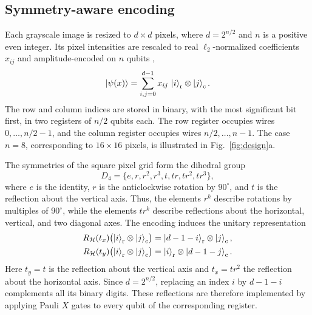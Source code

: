 \documentclass[aps,pra,reprint,superscriptaddress,longbibliography]{revtex4-2}
\begin{document}
\subsection{Symmetry-aware encoding}\label{subsec:encoding}
Each grayscale image is resized to $d\times d$ pixels, where
$d=2^{n/2}$ and $n$ is a positive even integer. Its pixel intensities
are rescaled to real $\ell_2$-normalized coefficients $x_{ij}$ and amplitude-encoded on $n$ qubits
\citep{schuld2021machine,yao2017quantum},
\begin{equation}
\ket{\psi(x)}
=\sum_{i,j=0}^{d-1}x_{ij}\,\ket{i}_{\mathrm r}\otimes\ket{j}_{\mathrm c}.
\label{eq:encoding}
\end{equation}
The row and column indices are stored in binary, with the most
significant bit first, in two registers of $n/2$ qubits each.
The row register occupies wires $0,\ldots,n/2-1$, and the column
register occupies wires $n/2,\ldots,n-1$. The case $n=8$, corresponding
to $16\times16$ pixels, is illustrated in Fig.~\ref{fig:design}a.

The symmetries of the square pixel grid form the dihedral group
\begin{equation}
D_4=\{e,r,r^2,r^3,t,tr,tr^2,tr^3\},
\end{equation}
where $e$ is the identity, $r$ is the anticlockwise rotation by
$90^\circ$, and $t$ is the reflection about the vertical axis.
Thus, the elements $r^k$ describe rotations by multiples of
$90^\circ$, while the elements $tr^k$ describe reflections about
the horizontal, vertical, and two diagonal axes.
The encoding induces the unitary representation
\begin{equation}
\begin{aligned}
R_{\mathcal H}(t_x)
\bigl(\ket{i}_{\mathrm r}\otimes\ket{j}_{\mathrm c}\bigr)
&=\ket{d-1-i}_{\mathrm r}\otimes\ket{j}_{\mathrm c},\\
R_{\mathcal H}(t_y)
\bigl(\ket{i}_{\mathrm r}\otimes\ket{j}_{\mathrm c}\bigr)
&=\ket{i}_{\mathrm r}\otimes\ket{d-1-j}_{\mathrm c}.
\end{aligned}
\end{equation}
Here $t_y=t$ is the reflection about the vertical axis and
$t_x=tr^2$ the reflection about the horizontal axis.
Since $d=2^{n/2}$, replacing an index $i$ by $d-1-i$ complements
all its binary digits. These reflections are therefore implemented
by applying Pauli $X$ gates to every qubit of the corresponding
register.
\end{document}

